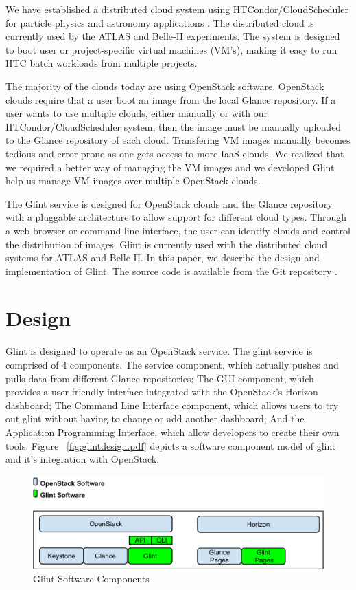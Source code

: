 \documentclass[a4paper]{jpconf}
\begin{document}
We have established a distributed cloud system using HTCondor/CloudScheduler for
particle physics and astronomy applications \cite{hpcs:cloudpaper, sobie-nyc-cloud}.
The distributed cloud is currently used by the ATLAS \cite{ryan-chep} 
and Belle-II \cite{sobie-chep} experiments.
The system is designed to boot user or project-specific virtual machines (VM's),
making it easy to run HTC batch workloads from multiple projects.

The majority of the clouds today are using OpenStack software.
OpenStack clouds require that a user boot an image from the local Glance repository.
If a user wants to use multiple clouds, either manually or with our 
HTCondor/CloudScheduler system, then the image must be manually uploaded 
to the Glance repository of each cloud.
Transfering VM images manually becomes tedious and error prone as one gets access
to more IaaS clouds.
We realized that we required a better way of managing the VM images and we 
developed Glint help us manage VM images over multiple OpenStack clouds.

The Glint service is designed for OpenStack clouds and the Glance repository
with a pluggable architecture to allow support for different cloud types.
Through a web browser or command-line interface, the user can identify clouds 
and control the distribution of images.
Glint is currently used with the distributed cloud systems for ATLAS and Belle-II.
In this paper, we describe the design and implementation of Glint.
The source code is available from the Git repository \cite{glint}.



\section{Design}
Glint is designed to operate as an OpenStack service. The glint service is comprised of 4 components. The service component, which actually pushes and pulls data from different Glance repositories; The GUI component, which provides a user friendly interface integrated with the OpenStack's Horizon dashboard; The Command Line Interface component, which allows users to try out glint without having to change or add another dashboard; And the Application Programming Interface, which allow developers to create their own tools. Figure ~\ref{fig:glintdesign.pdf} depicts a software component model of glint and it's integration with OpenStack. 

\begin{figure}[ht]
\begin{center}
\includegraphics[width=36pc]{images/glintdesign.pdf}
\caption{\label{fig:glintfigure}Glint Software Components}
\end{center}
\end{figure}
\end{document}
